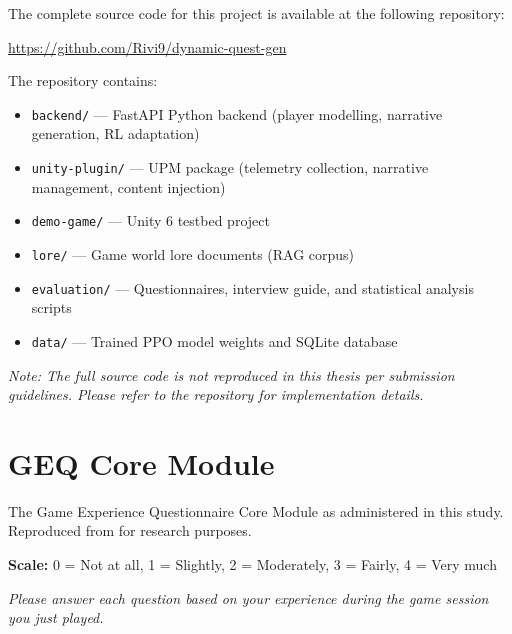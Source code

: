 \documentclass[12pt,a4paper]{report}
\begin{document}
The complete source code for this project is available at the following repository:

\begin{center}
\url{https://github.com/Rivi9/dynamic-quest-gen}
\end{center}

The repository contains:
\begin{itemize}
\item \texttt{backend/} --- FastAPI Python backend (player modelling, narrative generation, RL adaptation)
\item \texttt{unity-plugin/} --- UPM package (telemetry collection, narrative management, content injection)
\item \texttt{demo-game/} --- Unity 6 testbed project
\item \texttt{lore/} --- Game world lore documents (RAG corpus)
\item \texttt{evaluation/} --- Questionnaires, interview guide, and statistical analysis scripts
\item \texttt{data/} --- Trained PPO model weights and SQLite database
\end{itemize}

\textit{Note: The full source code is not reproduced in this thesis per submission guidelines. Please refer to the repository for implementation details.}


\chapter{GEQ Core Module}
\label{app:geq}

The Game Experience Questionnaire Core Module as administered in this study. Reproduced from \citet{ijsselsteijn2013geq} for research purposes.

\textbf{Scale:} 0 = Not at all, 1 = Slightly, 2 = Moderately, 3 = Fairly, 4 = Very much

\textit{Please answer each question based on your experience during the game session you just played.}
\end{document}
